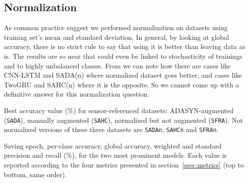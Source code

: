 \subsection{Normalization}
As common practice suggest we performed normalization on datasets using training set's mean and standard deviation.
In general, by looking at global accuracy, there is no strict rule to say that using it is better than leaving data as is.
The results are so near that could even be linked to stochasticity of trainings and to highly unbalanced classes.
From  we can note how there are cases like CNN-LSTM and SADA(n) where normalized dataset goes better, and cases like TwoGRU and SAHC(n) where it is the opposite.
So we cannot come up with a definitive answer for this normalization question.

\begin{table}[ht]
\centering
\caption{Best accuracy value (\%) for sensor-referenced datasets: ADASYN-augmented (\texttt{SADA}), manually augmented (\texttt{SAHC}), normalized but not augmented (\texttt{SFRA}). Not normalized versions of these three datasets are \texttt{SADAn}, \texttt{SAHCn} and \texttt{SFRAn}.}
\label{tab:norm-aug}

\end{table}

\begin{table}[ht]
\centering
\caption{Saving epoch, per-class accuracy, global accuracy, weighted and standard precision and recall (\%), for the two most prominent models.
Each value is reported according to the four metrics presented in section~\ref{ssec:metrics} (top to bottom, same order).}
\label{tab:metrics}

\end{table}

